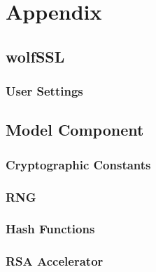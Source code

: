 \chapter{Appendix}
\section{wolfSSL}
\subsection{User Settings}




\section{Model Component}
\subsection{Cryptographic Constants}

\subsection{RNG}

\subsection{Hash Functions}


\subsection{RSA Accelerator}


